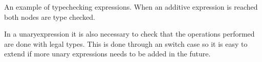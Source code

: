 An example of typechecking expressions. When an additive expression is reached both nodes are type checked.
\begin{figure}[H]
\centering
{}
\caption{}
\label{lf05}
\end{figure}

In a unaryexpression it is also necessary to check that the operations performed are done with legal types. This is done through an switch case so it is easy to extend if more unary expressions needs to be added in the future. 
\begin{figure}[H]
\centering
{}
\caption{}
\label{lf05}
\end{figure}

